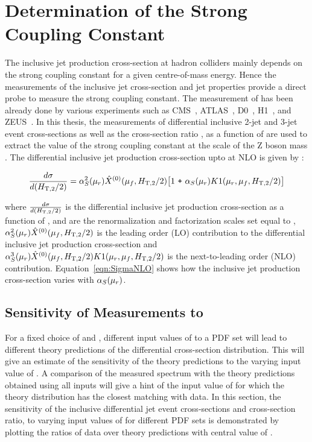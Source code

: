 \chapter{Determination of the Strong Coupling Constant}
\label{chap:Alphas}
The inclusive jet production cross-section at hadron colliders mainly depends on the strong coupling constant \alps for a given centre-of-mass energy. Hence the measurements of the inclusive jet cross-section and jet properties provide a direct probe to measure the strong coupling constant. The measurement of \alps has been already done by various experiments such as CMS~\cite{Chatrchyan:2013txa, Chatrchyan:2013haa, Khachatryan:2014waa, CMS:2014mna, Khachatryan:2016mlc}, ATLAS~\cite{ATLAS:2015yaa}, D0~\cite{Abazov:2009nc, Abazov:2012lua}, H1~\cite{Andreev:2014wwa, Andreev:2016tgi}, and ZEUS~\cite{Abramowicz:2012jz}. In this thesis, the measurements of differential inclusive 2-jet and 3-jet event cross-sections as well as the cross-section ratio \ratio, as a function of \httwo are used to extract the value of the strong coupling constant at  the  scale  of  the  Z boson mass \alpsmz. The differential inclusive jet production cross-section upto at NLO is given by \cite{Affolder:2001hn} :

 \begin{equation}
 \frac{d\sigma}{d(\httwo)} = \alpha_S^2(\mur)\hat{X}^{(0)}(\muf,\httwo)\big[1~\plus \alpha_S(\mur)K1(\mur, \muf,\httwo)\big]
 \label{eqn:SigmaNLO}
 \end{equation}

 where $\frac{d\sigma}{d(\httwo)}$ is the differential inclusive jet production cross-section as a function of \httwo, \mur and \muf are the renormalization and factorization scales set equal to \httwo, $\alpha_S^2(\mu_r)\hat{X}^{(0)}(\mu_f,H_{\mathrm{T,2}}/2)$ is the leading order (LO) contribution to the differential inclusive jet production cross-section and $\alpha_S^3(\mu_r)\hat{X}^{(0)}(\mu_f,H_{\mathrm{T,2}}/2)K1(\mu_r, \mu_f,H_{\mathrm{T,2}}/2)$ is the next-to-leading order (NLO) contribution. Equation~\ref{eqn:SigmaNLO} shows how the inclusive jet production cross-section varies with $\alpha_S(\mu_r)$. 
 
\section{Sensitivity of Measurements to \texorpdfstring{\alpsmz}{alpha-S(M(Z))}}
\label{sec:sensitivity}
 
For a fixed choice of \mur and \muf, different input values of \alpsmz to a PDF set will lead to different theory predictions of the differential cross-section distribution. This will give an estimate of the sensitivity of the theory predictions to the varying input value of \alpsmz. A comparison of the measured spectrum with the theory predictions obtained using all \alpsmz inputs will give a hint of the input value of \alpsmz for which the theory distribution has the closest matching with data. In this section, the sensitivity of the inclusive differential jet event cross-sections and cross-section ratio, \ratio to varying input values of \alpsmz for different PDF sets is demonstrated by plotting the ratios of data over theory predictions with central value of \alpsmz.


